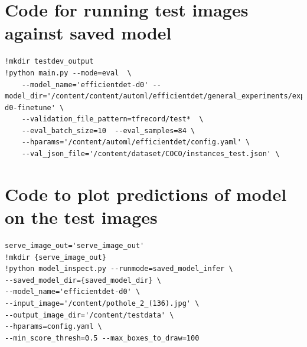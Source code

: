 \documentclass[12pt]{report}
\begin{document}
\section{Code for running test images against saved model}
\begin{lstlisting}
!mkdir testdev_output
!python main.py --mode=eval  \
    --model_name='efficientdet-d0' --model_dir='/content/content/automl/efficientdet/general_experiments/exp01/efficientdet-d0-finetune' \
    --validation_file_pattern=tfrecord/test*  \
    --eval_batch_size=10  --eval_samples=84 \
    --hparams='/content/automl/efficientdet/config.yaml' \
    --val_json_file='/content/dataset/COCO/instances_test.json' \
\end{lstlisting}

\section{Code to plot predictions of model on the test images}
\begin{lstlisting}
serve_image_out='serve_image_out'
!mkdir {serve_image_out}
!python model_inspect.py --runmode=saved_model_infer \
--saved_model_dir={saved_model_dir} \
--model_name='efficientdet-d0' \
--input_image='/content/pothole_2_(136).jpg' \
--output_image_dir='/content/testdata' \
--hparams=config.yaml \
--min_score_thresh=0.5 --max_boxes_to_draw=100
\end{lstlisting}

                
\end{document}
